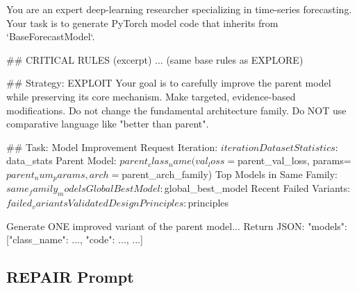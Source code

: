 \begin{promptbox}
You are an expert deep-learning researcher specializing in time-series forecasting.
Your task is to generate PyTorch model code that inherits from `BaseForecastModel`.

## CRITICAL RULES (excerpt)
... (same base rules as EXPLORE)

## Strategy: EXPLOIT
Your goal is to carefully improve the parent model while preserving its core
mechanism. Make targeted, evidence-based modifications. Do not change the
fundamental architecture family. Do NOT use comparative language like
"better than parent".

## Task: Model Improvement Request
Iteration: $iteration
Dataset Statistics: $data_stats
Parent Model: $parent_class_name (val_loss=$parent_val_loss,
 params=$parent_num_params, arch=$parent_arch_family)
Top Models in Same Family: $same_family_models
Global Best Model: $global_best_model
Recent Failed Variants: $failed_variants
Validated Design Principles: $principles

Generate ONE improved variant of the parent model...
Return JSON: {"models": [{"class_name": ..., "code": ..., ...}]}
\end{promptbox}

\subsection{REPAIR Prompt}


